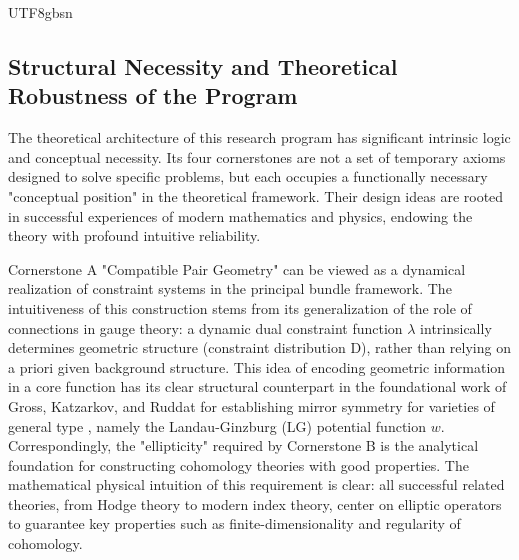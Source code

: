 \documentclass[a4paper,12pt]{extarticle}
\theoremstyle{definition}
\begin{document}
\begin{CJK}{UTF8}{gbsn}
\subsection{Structural Necessity and Theoretical Robustness of the Program}
\label{sec:structural_inevitability}

The theoretical architecture of this research program has significant intrinsic logic and conceptual necessity. Its four cornerstones are not a set of temporary axioms designed to solve specific problems, but each occupies a functionally necessary "conceptual position" in the theoretical framework. Their design ideas are rooted in successful experiences of modern mathematics and physics, endowing the theory with profound intuitive reliability.

Cornerstone A "Compatible Pair Geometry" can be viewed as a dynamical realization of constraint systems in the principal bundle framework. The intuitiveness of this construction stems from its generalization of the role of connections in gauge theory: a dynamic dual constraint function $\lambda$ intrinsically determines geometric structure (constraint distribution D), rather than relying on a priori given background structure. This idea of encoding geometric information in a core function has its clear structural counterpart in the foundational work of Gross, Katzarkov, and Ruddat for establishing mirror symmetry for varieties of general type \cite{gross2017towards}, namely the Landau-Ginzburg (LG) potential function $w$. Correspondingly, the "ellipticity" required by Cornerstone B is the analytical foundation for constructing cohomology theories with good properties. The mathematical physical intuition of this requirement is clear: all successful related theories, from Hodge theory to modern index theory, center on elliptic operators to guarantee key properties such as finite-dimensionality and regularity of cohomology.


\end{CJK}
\end{document}
